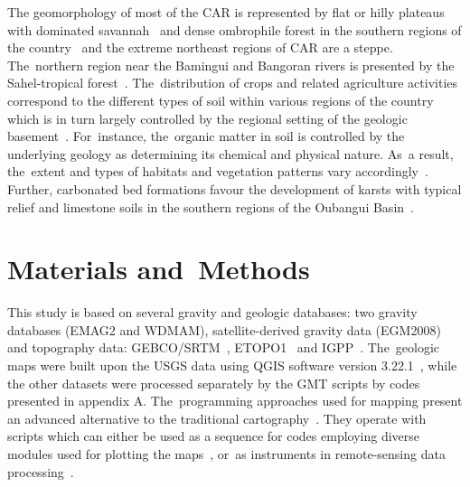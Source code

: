 \documentclass[minerals,article,accept,pdftex,moreauthors]{Definitions/mdpi}
\begin{document}
The geomorphology of most of the CAR is represented by flat or hilly plateaus with dominated savannah~\cite{Nguimalet} and dense ombrophile forest in the southern regions of the country~\cite{Suchel} and the extreme northeast regions of CAR are a steppe. The~northern region near the Bamingui  and Bangoran rivers is presented by the Sahel-tropical %
forest~\cite{Spinage1988}. The~distribution of crops and related agriculture activities correspond to the different types of soil within various regions of the country which is in turn largely controlled by the regional setting of the geologic basement~\cite{Villien1988,Quantin1965,Prioul}. For~instance, the~organic matter in soil is controlled by the underlying geology as determining its chemical and physical nature. As~a result, the~extent and types of habitats and vegetation patterns vary accordingly~\cite{CombeauQuantin,Quantin1962}. Further, carbonated bed formations favour the development of karsts with typical relief and limestone soils in the southern regions of the Oubangui Basin~\cite{Salomon}.

\section{Materials and~Methods}
This study is based on several gravity and geologic databases: two gravity databases (EMAG2 and WDMAM), satellite-derived gravity data (EGM2008) and topography data: GEBCO/SRTM~\cite{GEBCO,SRTM}, ETOPO1~\cite{NOAA} and IGPP~\cite{SANDWELL20211059,Pavlis}. The~geologic maps were built upon the USGS data using QGIS software version 3.22.1~\cite{QGIS_software}, while the other datasets were processed separately by the GMT scripts by codes {presented in appendix A}. The~programming approaches used for mapping present an advanced alternative to the traditional cartography~\cite{TRAORE2020103933,RUNGE2005311,TRAORE2021100114}. They operate with scripts which can either be used as a sequence for codes employing diverse modules used for plotting the maps~\cite{4814952,Lemenkova202230,8588718,Lemenkova202228}, or~as instruments in remote-sensing data processing~\cite{9964623,Lemenkova202229,7577632,Lemenkova202227}.
\end{document}
